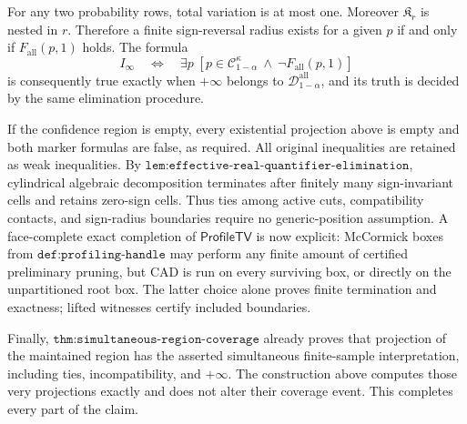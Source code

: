 For any two probability rows, total variation is at most one.  Moreover \(\mathfrak K_r\) is nested in \(r\).  Therefore a finite sign-reversal radius exists for a given \(p\) if and only if \(F_{\mathrm{all}}(p,1)\) holds.  The formula
\[
 I_{\infty}\quad\Longleftrightarrow\quad
 \exists p\;[p\in\mathcal C_{1-\alpha}^{\kappa}\ \wedge\ 
 \neg F_{\mathrm{all}}(p,1)]
\]
is consequently true exactly when \(+\infty\) belongs to \(\mathcal D_{1-\alpha}^{\mathrm{all}}\), and its truth is decided by the same elimination procedure.

If the confidence region is empty, every existential projection above is empty and both marker formulas are false, as required.  All original inequalities are retained as weak inequalities.  By \(\texttt{lem:effective-real-quantifier-elimination}\), cylindrical algebraic decomposition terminates after finitely many sign-invariant cells and retains zero-sign cells.  Thus ties among active cuts, compatibility contacts, and sign-radius boundaries require no generic-position assumption.  A face-complete exact completion of \(\mathsf{ProfileTV}\) is now explicit: McCormick boxes from \(\texttt{def:profiling-handle}\) may perform any finite amount of certified preliminary pruning, but CAD is run on every surviving box, or directly on the unpartitioned root box.  The latter choice alone proves finite termination and exactness; lifted witnesses certify included boundaries.

Finally, \(\texttt{thm:simultaneous-region-coverage}\) already proves that projection of the maintained region has the asserted simultaneous finite-sample interpretation, including ties, incompatibility, and \(+\infty\).  The construction above computes those very projections exactly and does not alter their coverage event.  This completes every part of the claim.